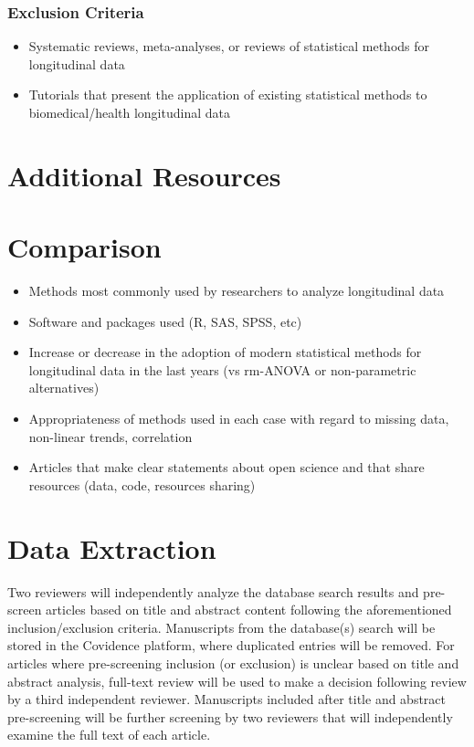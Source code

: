 \documentclass[
]{article}
\begin{document}
\hypertarget{exclusion-criteria-1}{%
\subsubsection{Exclusion Criteria}\label{exclusion-criteria-1}}

\begin{itemize}
\item
  Systematic reviews, meta-analyses, or reviews of statistical methods
  for longitudinal data
\item
  Tutorials that present the application of existing statistical methods
  to biomedical/health longitudinal data
\end{itemize}

\hypertarget{additional-resources}{%
\section{Additional Resources}\label{additional-resources}}

\hypertarget{comparison}{%
\section{Comparison}\label{comparison}}

\begin{itemize}
\item
  Methods most commonly used by researchers to analyze longitudinal data
\item
  Software and packages used (R, SAS, SPSS, etc)
\item
  Increase or decrease in the adoption of modern statistical methods for
  longitudinal data in the last  years (vs rm-ANOVA or
  non-parametric alternatives)
\item
  Appropriateness of methods used in each case with regard to missing
  data, non-linear trends, correlation
\item
  Articles that make clear statements about open science and that share
  resources (data, code, resources sharing)
\end{itemize}

\hypertarget{data-extraction}{%
\section{Data Extraction}\label{data-extraction}}

Two reviewers will independently analyze the database search results and
pre-screen articles based on title and abstract content following the
aforementioned inclusion/exclusion criteria. Manuscripts from the
database(s) search will be stored in the Covidence platform, where
duplicated entries will be removed. For articles where pre-screening
inclusion (or exclusion) is unclear based on title and abstract
analysis, full-text review will be used to make a decision following
review by a third independent reviewer. Manuscripts included after title
and abstract pre-screening will be further screening by two reviewers
that will independently examine the full text of each article.
\end{document}
